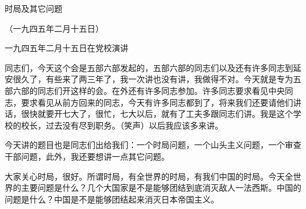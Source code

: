 时局及其它问题

（一九四五年二月十五日）

一九四五年二月十五日在党校演讲



同志们，今天这个会是五部六部发起的，五部六部的同志们以及还有许多同志到延安很久了，有些来了两三年了，我一次讲也没有讲，我做得不对。今天就是专为五部六部的同志们开这样的会。在外还有许多同志参加。许多同志要求看见中央同志，要求看见从前方回来的同志，今天有许多同志都到了，将来我们还要请他们讲话，很快就要开七大了，很忙，七大以后，就有了工夫多跟同志们讲。我是这个学校的校长，过去没有尽到职务。（笑声）以后我应该多来讲。

今天讲的题目也是同志们出给我们：一个时局问题，一个山头主义问题，一个审查干部问题，此外，我还要想讲一点其它问题。

大家关心时局，很好。所谓时局，有全世界的时局，有我们中国的时局。今天全世界的主要问题是什么？几个大国家是不是能够团结到底消灭敌人一法西斯。中国的问题是什么？中国是不是能够团结起来消灭日本帝国主义。

